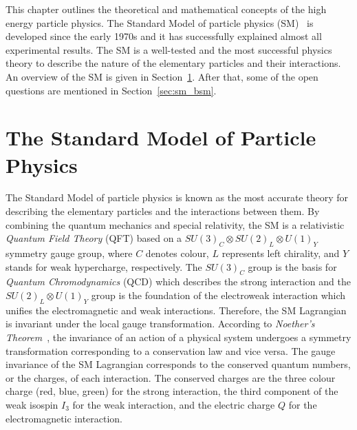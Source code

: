 This chapter outlines the theoretical and mathematical concepts of the high energy particle physics.
The Standard Model of particle physics (SM)~\cite{BF02726525,0029-55826190469-2,PhysRevLett.19.1264,Herrero:1998eq,CBO9780511791406} is developed since the early 1970s and it has successfully explained almost all experimental results.
The SM is a well-tested and the most successful physics theory to describe the nature of the elementary particles and their interactions.
An overview of the SM is given in Section~\ref{sec:sm}.
After that, some of the open questions are mentioned in Section~\ref{sec:sm_bsm}.


\section{The Standard Model of Particle Physics}
\label{sec:sm}
The Standard Model of particle physics is known as the most accurate theory for describing the elementary particles and the interactions between them.
By combining the quantum mechanics and special relativity, the SM is a relativistic \textit{Quantum Field Theory} (QFT) based on a $SU(3)_{C} \otimes SU(2)_{L} \otimes U(1)_{Y}$ symmetry gauge group, where $C$ denotes colour, $L$ represents left chirality, and $Y$ stands for weak hypercharge, respectively.
The $SU(3)_{C}$ group is the basis for \textit{Quantum Chromodynamics} (QCD) which describes the strong interaction and the $SU(2)_{L} \otimes U(1)_{Y}$ group is the foundation of the electroweak interaction which unifies the electromagnetic and weak interactions.
Therefore, the SM Lagrangian is invariant under the local gauge transformation.
According to \textit{Noether's Theorem}~\cite{00411457108231446}, the invariance of an action of a physical system undergoes a symmetry transformation corresponding to a conservation law and vice versa. 
The gauge invariance of the SM Lagrangian corresponds to the conserved quantum numbers, or the charges, of each interaction.
The conserved charges are the three colour charge (red, blue, green) for the strong interaction, the third component of the weak isospin $I_{3}$ for the weak interaction, and the electric charge $Q$ for the electromagnetic interaction.


